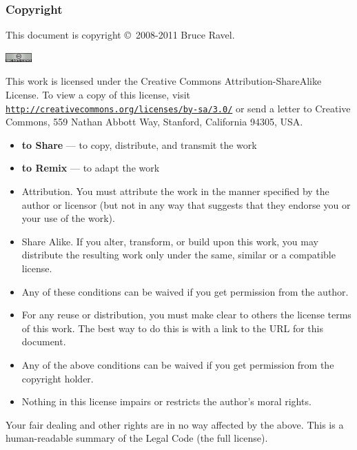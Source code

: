 
\begin{frame}
  \frametitle{Copyright}
  \tiny

  This document is copyright \copyright\ 2008-2011 Bruce Ravel.

  \begin{center}
    \includegraphics[width=1.0cm]{images/somerights20}
  \end{center}

  This work is licensed under the Creative Commons
  Attribution-ShareAlike License.  To view a copy of this license,
  visit \href{http://creativecommons.org/licenses/by-sa/3.0/}
  {\color{Purple4}\texttt{http://creativecommons.org/licenses/by-sa/3.0/}}
  or send a letter to Creative Commons, 559 Nathan Abbott Way,
  Stanford, California 94305, USA.

  \begin{description}
  \tiny
  \item[You are free:] %
    \begin{itemize}
      \tiny
    \item \textbf{to Share} --- to copy, distribute, and transmit the work
    \item \textbf{to Remix} --- to adapt the work
    \end{itemize}
  \item[Under the following conditions:] %
    \begin{itemize}
      \tiny
    \item Attribution. You must attribute the work in the manner
      specified by the author or licensor (but not in any way that
      suggests that they endorse you or your use of the work).
    \item Share Alike. If you alter, transform, or build upon this
      work, you may distribute the resulting work only under the same,
      similar or a compatible license.
    \item Any of these conditions can be waived if you get permission
      from the author.
    \end{itemize}
  \end{description}
  \begin{itemize}
  \tiny
  \item For any reuse or distribution, you must make clear to others
    the license terms of this work. The best way to do this is with a
    link to the URL for this document.
  \item Any of the above conditions can be waived if you get
    permission from the copyright holder.
  \item Nothing in this license impairs or restricts the author's
    moral rights.
  \end{itemize}

  Your fair dealing and other rights are in no way affected by the
  above.  This is a human-readable summary of the Legal Code (the full
  license).


\end{frame}

